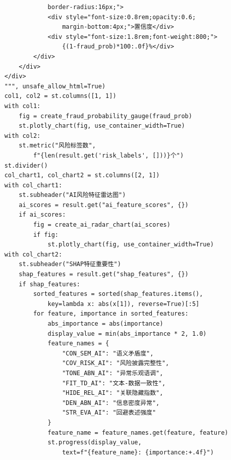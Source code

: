 \documentclass[a4paper,10pt]{article}
\begin{document}
\begin{lstlisting}
                border-radius:16px;">
                <div style="font-size:0.8rem;opacity:0.6;
                    margin-bottom:4px;">置信度</div>
                <div style="font-size:1.8rem;font-weight:800;">
                    {(1-fraud_prob)*100:.0f}%</div>
            </div>
        </div>
    </div>
    """, unsafe_allow_html=True)
    col1, col2 = st.columns([1, 1])
    with col1:
        fig = create_fraud_probability_gauge(fraud_prob)
        st.plotly_chart(fig, use_container_width=True)
    with col2:
        st.metric("风险标签数",
            f"{len(result.get('risk_labels', []))}个")
    st.divider()
    col_chart1, col_chart2 = st.columns([2, 1])
    with col_chart1:
        st.subheader("AI风险特征雷达图")
        ai_scores = result.get("ai_feature_scores", {})
        if ai_scores:
            fig = create_ai_radar_chart(ai_scores)
            if fig:
                st.plotly_chart(fig, use_container_width=True)
    with col_chart2:
        st.subheader("SHAP特征重要性")
        shap_features = result.get("shap_features", {})
        if shap_features:
            sorted_features = sorted(shap_features.items(),
                key=lambda x: abs(x[1]), reverse=True)[:5]
            for feature, importance in sorted_features:
                abs_importance = abs(importance)
                display_value = min(abs_importance * 2, 1.0)
                feature_names = {
                    "CON_SEM_AI": "语义矛盾度",
                    "COV_RISK_AI": "风险披露完整性",
                    "TONE_ABN_AI": "异常乐观语调",
                    "FIT_TD_AI": "文本-数据一致性",
                    "HIDE_REL_AI": "关联隐藏指数",
                    "DEN_ABN_AI": "信息密度异常",
                    "STR_EVA_AI": "回避表述强度"
                }
                feature_name = feature_names.get(feature, feature)
                st.progress(display_value,
                    text=f"{feature_name}: {importance:+.4f}")
\end{lstlisting}
\end{document}
